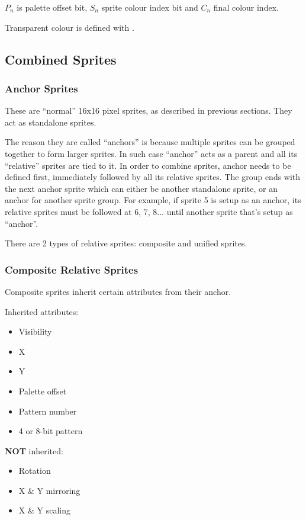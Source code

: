 $P_n$ is palette offset bit, $S_n$ sprite colour index bit and $C_n$ final colour index.

Transparent colour is defined with .


\pagebreak
\subsection{Combined Sprites}

\subsubsection{Anchor Sprites}

These are ``normal'' 16x16 pixel sprites, as described in previous sections. They act as standalone sprites.

The reason they are called ``anchors'' is because multiple sprites can be grouped together to form larger sprites. In such case ``anchor'' acts as a parent and all its ``relative'' sprites are tied to it. In order to combine sprites, anchor needs to be defined first, immediately followed by all its relative sprites. The group ends with the next anchor sprite which can either be another standalone sprite, or an anchor for another sprite group. For example, if sprite 5 is setup as an anchor, its relative sprites must be followed at 6, 7, 8... until another sprite that's setup as ``anchor''.

There are 2 types of relative sprites: composite and unified sprites.

\subsubsection{Composite Relative Sprites}

Composite sprites inherit certain attributes from their anchor.

\begin{multicols}{2}
	 Inherited attributes:

	\begin{itemize}[topsep=1pt,itemsep=1pt]
		\item Visibility
		\item X
		\item Y
		\item Palette offset
		\item Pattern number
		\item 4 or 8-bit pattern 
	\end{itemize}

	\columnbreak

	\textbf{NOT} inherited:

	\begin{itemize}[topsep=1pt,itemsep=1pt]
		\item Rotation
		\item X \& Y mirroring
		\item X \& Y scaling
	\end{itemize}

\end{multicols}

